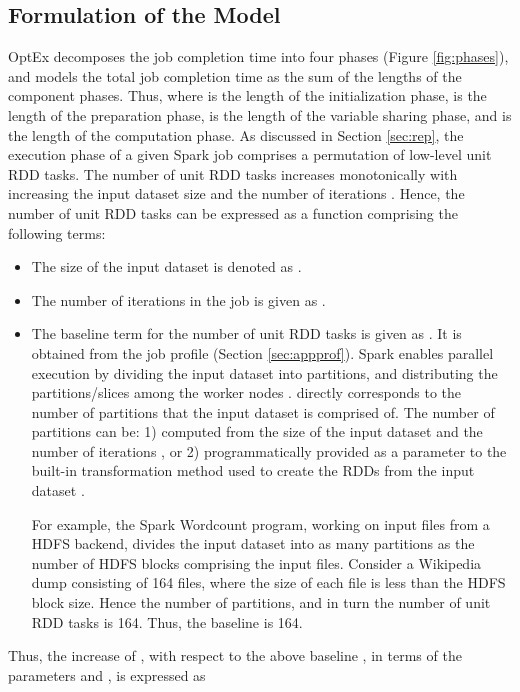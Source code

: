\documentclass[conference]{IEEEtran}
\begin{document}
 \subsection{Formulation of the Model}\label{sec:formulation}
OptEx decomposes the job completion time into four phases (Figure \ref{fig:phases}), and
models the total job completion time  as the sum of the lengths of the component phases. Thus,  where  is the length of the initialization phase,  is  the length of the preparation phase,  is the length of the variable sharing phase, and   is the length of the computation phase.
As
   discussed in Section \ref{sec:rep}, the execution phase of a given Spark job comprises a permutation
 of low-level unit RDD tasks. The number  of unit RDD tasks  increases monotonically with increasing
 the input dataset size  and the number of iterations  \cite{Zaharia:2012:RDD:2228298.2228301}.
  Hence, the number  of unit RDD tasks 
can be expressed as a function comprising the following terms:
 \begin{itemize}
   \item  The size of the
   input dataset is denoted as .
  \item The number of iterations  in the job is given as .
 \item The baseline term for the number of unit RDD tasks is given as . It is obtained from the job
 profile (Section \ref{sec:appprof}). Spark enables parallel execution by dividing the input dataset into partitions, and distributing the partitions/slices among the worker nodes  \cite{Zaharia:2012:RDD:2228298.2228301}.   directly corresponds to the number of partitions that the input dataset is comprised of.
 The number of
 partitions can be: 1) computed from the size  of the input dataset and the number of iterations  \cite{Zaharia:2012:RDD:2228298.2228301}, or
 2) programmatically provided as a parameter to the built-in transformation method used to create the RDDs
 from the input dataset \cite{Zaharia:2012:RDD:2228298.2228301}.
 \par For example, the Spark Wordcount program, working on input files from a HDFS backend,
 divides the input dataset into as many partitions as the number of HDFS blocks comprising the input files. Consider a Wikipedia dump \cite{snapnets} consisting of 164 files, where the
 size of each file is less than the HDFS block size. Hence the number of partitions, and in turn the number
 of unit RDD tasks is 164. Thus, the baseline  is 164.

\end{itemize}
 Thus, the increase of  , with respect to the above baseline , in terms
  of the parameters  and , is expressed as
 
\end{document}
